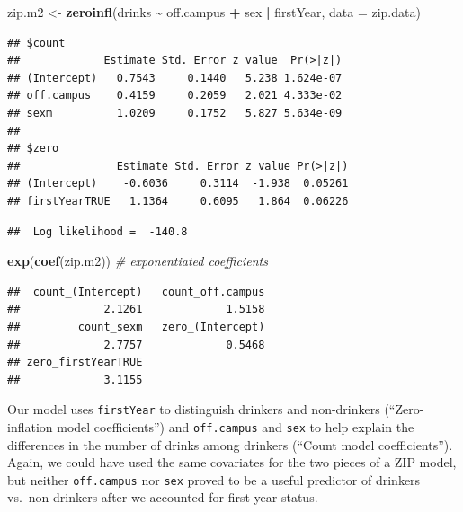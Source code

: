 \documentclass[
]{krantz}
\newenvironment{Shaded}{\begin{snugshade}}{\end{snugshade}}
\newcommand{\AttributeTok}[1]{\textcolor[rgb]{0.27,0.27,0.27}{#1}}
\newcommand{\CommentTok}[1]{\textcolor[rgb]{0.37,0.37,0.37}{\textit{#1}}}
\newcommand{\FunctionTok}[1]{\textcolor[rgb]{0.27,0.27,0.27}{\textbf{#1}}}
\newcommand{\NormalTok}[1]{#1}
\newcommand{\OtherTok}[1]{\textcolor[rgb]{0.37,0.37,0.37}{#1}}
\newcommand{\SpecialCharTok}[1]{\textcolor[rgb]{0.43,0.43,0.43}{\textbf{#1}}}
\begin{document}
\begin{Shaded}
\begin{Highlighting}[]
\NormalTok{zip.m2 }\OtherTok{\textless{}{-}} \FunctionTok{zeroinfl}\NormalTok{(drinks }\SpecialCharTok{\textasciitilde{}}\NormalTok{ off.campus }\SpecialCharTok{+}\NormalTok{ sex }\SpecialCharTok{|}\NormalTok{ firstYear, }
                   \AttributeTok{data =}\NormalTok{ zip.data)}
\end{Highlighting}
\end{Shaded}

\begin{verbatim}
## $count
##             Estimate Std. Error z value  Pr(>|z|)
## (Intercept)   0.7543     0.1440   5.238 1.624e-07
## off.campus    0.4159     0.2059   2.021 4.333e-02
## sexm          1.0209     0.1752   5.827 5.634e-09
## 
## $zero
##               Estimate Std. Error z value Pr(>|z|)
## (Intercept)    -0.6036     0.3114  -1.938  0.05261
## firstYearTRUE   1.1364     0.6095   1.864  0.06226
\end{verbatim}

\begin{verbatim}
##  Log likelihood =  -140.8
\end{verbatim}

\begin{Shaded}
\begin{Highlighting}[]
\FunctionTok{exp}\NormalTok{(}\FunctionTok{coef}\NormalTok{(zip.m2))   }\CommentTok{\# exponentiated coefficients}
\end{Highlighting}
\end{Shaded}

\begin{verbatim}
##  count_(Intercept)   count_off.campus 
##             2.1261             1.5158 
##         count_sexm   zero_(Intercept) 
##             2.7757             0.5468 
## zero_firstYearTRUE 
##             3.1155
\end{verbatim}

Our model uses \texttt{firstYear} to distinguish drinkers and non-drinkers (``Zero-inflation model coefficients'') and \texttt{off.campus} and \texttt{sex} to help explain the differences in the number of drinks among drinkers (``Count model coefficients''). Again, we could have used the same covariates for the two pieces of a ZIP model, but neither \texttt{off.campus} nor \texttt{sex} proved to be a useful predictor of drinkers vs.~non-drinkers after we accounted for first-year status.
\end{document}
